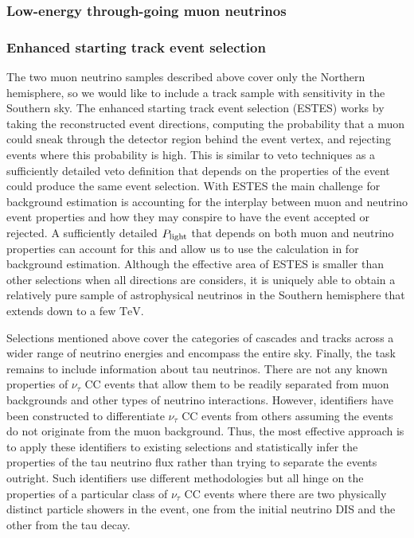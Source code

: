 \subsubsection{Low-energy through-going muon neutrinos}


\subsubsection{Enhanced starting track event selection}
The two muon neutrino samples described above cover only the Northern hemisphere, so we would like to include a track sample with sensitivity in the Southern sky.
The enhanced starting track event selection (ESTES) works by taking the reconstructed event directions, computing the probability that a muon could sneak through the detector region behind the event vertex, and rejecting events where this probability is high.
This is similar to veto techniques as a sufficiently detailed veto definition that depends on the properties of the event could produce the same event selection.
With ESTES the main challenge for background estimation is accounting for the interplay between muon and neutrino event properties and how they may conspire to have the event accepted or rejected.
A sufficiently detailed $P_{\rm light}$ that depends on both muon and neutrino properties can account for this and allow us to use the calculation in  for background estimation.
Although the effective area of ESTES is smaller than other selections when all directions are considers, it is uniquely able to obtain a relatively pure sample of astrophysical neutrinos in the Southern hemisphere that extends down to a few $\si\TeV$.

Selections mentioned above cover the categories of cascades and tracks across a wider range of neutrino energies and encompass the entire sky.
Finally, the task remains to include information about tau neutrinos.
There are not any known properties of $\nu_\tau$ CC events that allow them to be readily separated from muon backgrounds and other types of neutrino interactions.
However, identifiers have been constructed to differentiate $\nu_\tau$ CC events from others assuming the events do not originate from the muon background.
Thus, the most effective approach is to apply these identifiers to existing selections and statistically infer the properties of the tau neutrino flux rather than trying to separate the events outright.
Such identifiers use different methodologies but all hinge on the properties of a particular class of $\nu_\tau$ CC events where there are two physically distinct particle showers in the event, one from the initial neutrino DIS and the other from the tau decay.

